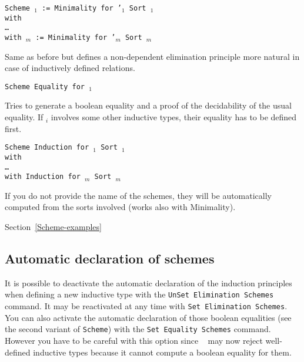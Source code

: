 \begin{Variants}
\item {\tt Scheme {\ident$_1$} := Minimality for \ident'$_1$ Sort {\sort$_1$} \\
    with\\
    \mbox{}\hspace{0.1cm} \dots\ \\
    with {\ident$_m$} := Minimality for {\ident'$_m$} Sort
    {\sort$_m$}}

  Same as before but defines a non-dependent elimination principle more
  natural in case of inductively defined relations. 

\item {\tt Scheme Equality for \ident$_1$}

  Tries to generate a boolean equality and a proof of the
  decidability of the usual equality. If \ident$_i$ involves
  some other inductive types, their equality has to be defined first.

\item {\tt Scheme Induction for \ident$_1$ Sort {\sort$_1$} \\
  with\\
  \mbox{}\hspace{0.1cm} \dots\\
        with Induction for {\ident$_m$} Sort
        {\sort$_m$}}

  If you do not provide the name of the schemes, they will be automatically 
  computed from the sorts involved (works also with Minimality).

\end{Variants}

\SeeAlso Section~\ref{Scheme-examples}

\subsection{Automatic declaration of schemes}
It is possible to deactivate the automatic declaration of the induction
 principles when defining a new inductive type  with the
 {\tt UnSet Elimination Schemes} command. It may be
reactivated at any time with {\tt Set Elimination Schemes}. 
\\

You can also activate the automatic declaration of those boolean equalities 
(see the second variant of {\tt Scheme})  with the {\tt Set Equality Schemes}
 command. However you have to be careful with this option since
\Coq~ may now reject well-defined inductive types because it cannot compute
a boolean equality for them.


